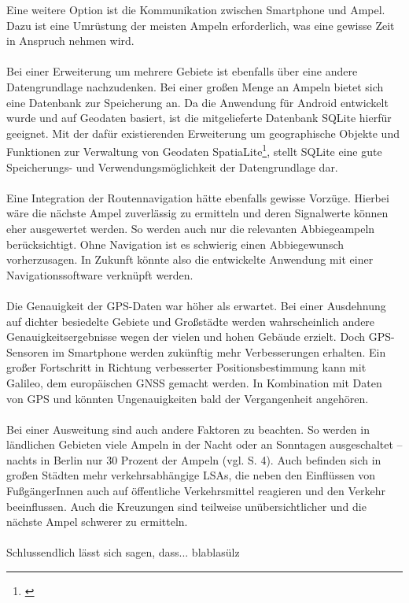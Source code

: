 Eine weitere Option ist die Kommunikation zwischen \gls{Smartphone} und Ampel. Dazu ist eine Umrüstung der meisten Ampeln erforderlich, was eine gewisse Zeit in Anspruch nehmen wird. \cite{smart_lsa}\\\\
Bei einer Erweiterung um mehrere Gebiete ist ebenfalls über eine andere Datengrundlage nachzudenken. Bei einer großen Menge an Ampeln bietet sich eine Datenbank zur Speicherung an.
Da die Anwendung für Android entwickelt wurde und auf Geodaten basiert, ist die mitgelieferte Datenbank SQLite hierfür geeignet. Mit der dafür existierenden Erweiterung um geographische Objekte und Funktionen zur Verwaltung von Geodaten SpatiaLite\footnote{\cite{sparta}}, stellt SQLite eine gute Speicherungs- und Verwendungsmöglichkeit der Datengrundlage dar.\\\\
Eine Integration der Routennavigation hätte ebenfalls gewisse Vorzüge. Hierbei wäre die nächste Ampel zuverlässig zu ermitteln und deren Signalwerte können eher ausgewertet werden. So werden auch nur die relevanten Abbiegeampeln berücksichtigt. Ohne Navigation ist es schwierig einen Abbiegewunsch vorherzusagen. In Zukunft könnte also die entwickelte Anwendung mit einer Navigationssoftware verknüpft werden.\\\\
Die Genauigkeit der \gls{GPS}-Daten war höher als erwartet. Bei einer Ausdehnung auf dichter besiedelte Gebiete und Großstädte werden wahrscheinlich andere Genauigkeitsergebnisse wegen der vielen und hohen Gebäude erzielt. Doch \gls{GPS}-Sensoren im \gls{Smartphone} werden zukünftig mehr Verbesserungen erhalten. 
Ein großer Fortschritt in Richtung verbesserter Positionsbestimmung kann mit Galileo, dem europäischen \gls{GNSS} gemacht werden. In Kombination mit Daten von \gls{GPS} und  könnten Ungenauigkeiten bald der Vergangenheit angehören. \cite{gnss}\\\\
Bei einer Ausweitung sind auch andere Faktoren zu beachten. So werden in ländlichen Gebieten viele Ampeln in der Nacht oder an Sonntagen ausgeschaltet -- nachts in Berlin nur 30 Prozent der Ampeln (vgl. \cite{lsa_bln} S. 4). Auch befinden sich in großen Städten mehr verkehrsabhängige \glspl{LSA}, die neben den Einflüssen von FußgängerInnen auch auf öffentliche Verkehrsmittel reagieren und den Verkehr beeinflussen. Auch die Kreuzungen sind teilweise unübersichtlicher und die nächste Ampel schwerer zu ermitteln.\\\\
Schlussendlich lässt sich sagen, dass... blablasülz
